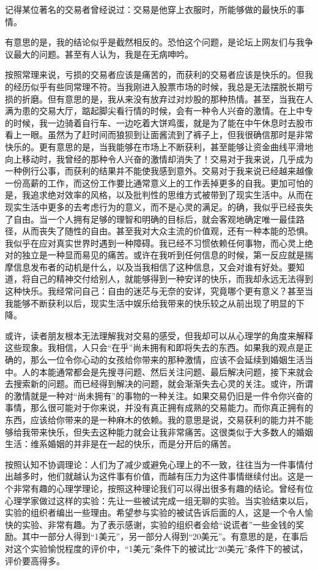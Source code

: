 记得某位著名的交易者曾经说过：交易是他穿上衣服时，所能够做的最快乐的事情。

有意思的是，我的结论似乎是截然相反的。恐怕这个问题，是论坛上网友们与我争议最大的问题。甚至有人认为，我是在无病呻吟。

按照常理来说，亏损的交易者应该是痛苦的，而获利的交易者应该是快乐的。但我的经历似乎有些同常理不符。当我刚进入股票市场的时候，我总是无法摆脱长期亏损的折磨。但有意思的是，我从来没有放弃过对炒股的那种热情。甚至，当我在人满为患的交易大厅，踮起脚尖看行情的时候，会有一种令人兴奋的激情。在上中专的时候，我一边骑着自行车、一边吃着大饼鸡蛋，就是为了能在中午休息时去股市看上一眼。虽然为了赶时间而狼狈到让面酱流到了裤子上，但我很确信那时是非常快乐的。更有意思的是，当我能够在市场上不断获利，甚至能够让资金曲线平滑地向上移动时，我曾经的那种令人兴奋的激情却消失了！交易对于我来说，几乎成为一种例行公事，而获利的结果并不能使我感到意外。交易对于我来说已经越来越像一份高薪的工作，而这份工作要比通常意义上的工作丢掉更多的自我。更加可怕的是，我追求绝对效率的风格，以及批判性的思维方式被带到了现实生活中。从而在现实生活中更多的去考虑行为的意义，而不是心灵的满足。的确，我似乎已经丧失了自由。当一个人拥有足够的理智和明确的目标后，就会客观地确定唯一最佳路径，从而丧失了随性的自由。甚至我对大众主流的价值观，还有一种本能的恐惧。我似乎在应对真实世界时遇到一种障碍。我已经不习惯依赖任何事物，而心灵上绝对的独立是一种显而易见的痛苦。或许在我听到任何信息的时候，第一反应就是揣摩信息发布者的动机是什么，以及当我相信了这种信息，又会对谁有好处。要知道，将自己的精神交付给别人，就能够得到一种安详的快乐，而我却永远无法得到这种快乐。我经常问自己：自由的迷茫与无奈的安详，究竟哪个更有意义？甚至当我能够不断获利以后，现实生活中娱乐给我带来的快乐较之从前出现了明显的下降。

或许，读者朋友根本无法理解我对交易的感受，但我却可以从心理学的角度来解释这些现象。我相信，人只会“在乎”尚未拥有和即将失去的东西。如果我的观点是正确的，那么一位令你心动的女孩给你带来的那种激情，应该不会延续到婚姻生活当中。人的本能通常都会是先搜寻问题、然后关注问题、最后解决问题，接下来就会去搜索新的问题。而已经得到解决的问题，就会渐渐失去心灵的关注。或许，所谓的激情就是一种对“尚未拥有”的事物的一种关注。如果交易仍旧是一件令你兴奋的事情，那么很可能对于你来说，并没有真正拥有成熟的交易能力。而你真正拥有的东西，应该给你带来的是一种麻木的依赖。我的意思是说，交易获利的能力并不能够给我带来快乐，但失去这种能力就会让我非常痛苦。这很类似于大多数人的婚姻生活：维系婚姻的并非是在一起的快乐，而是分开后的痛苦。

按照认知不协调理论：人们为了减少或避免心理上的不一致，往往当为一件事情付出越多时，他们就越认为这件事有价值，而越有压力为这件事情继续付出。这是一个非常有趣的心理学理论，按照这种理论我们可以得出很多有趣的结论。曾经有位心理学家做过这样的实验：先让一些被试完成一组无聊的实验。当实验结束以后，实验的组织者编出一些理由。希望参与实验的被试告诉后面的人，这是一个令人愉快的实验、非常有趣。为了表示感谢，实验的组织者会给“说谎者”一些金钱的奖励。其中一部分人得到“1美元”，另一部分人得到“20美元”。有意思的是，在事后对这个实验愉悦程度的评价中，“1美元”条件下的被试比“20美元”条件下的被试，评价要高得多。

